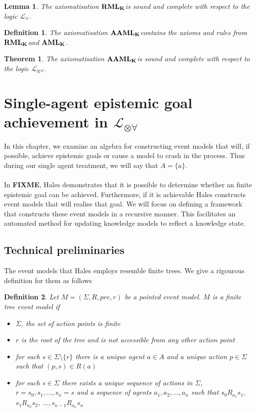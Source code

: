 \documentclass[12pt, a4paper, titlepage]{scrartcl}
\newtheorem{defn}{Definition}[subsection]
\newtheorem{thm}{Theorem}[subsection]
\newtheorem{lemma}{Lemma}[subsection]
\numberwithin{equation}{section}
\newcommand{\lang}{\mathcal{L}}
\newcommand{\langRefine}{\lang_{\forall}}
\newcommand{\langArbAct}{\lang_{\otimes\forall}}
\newcommand{\AXK}{{\bf K}}
\newcommand{\AXAML}{${\bf AML_{\AXK}}$}
\newcommand{\AXRML}{${\bf RML_{\AXK}}$}
\newcommand{\AXAAML}{${\bf AAML_{\AXK}}$}
\newcommand{\FIXME}{{\bf FIXME}}
\begin{document}
\begin{lemma} \label{axiomRMLSoundComplete}
The axiomatisation \AXRML is sound and complete with respect to the logic $\langRefine$.
\end{lemma}

\begin{defn} \label{axiomAAML}
The axiomatisation \AXAAML contains the axioms and rules from \AXRML and \AXAML.
\end{defn}

\begin{thm} \label{axiomAAMLSoundComplete}
The axiomatisation \AXAAML is sound and complete with respect to the logic $\langArbAct$.
\end{thm}

\section{Single-agent epistemic goal achievement in $\langArbAct$}

In this chapter, we examine an algebra for constructing event models that will, if possible, achieve
epistemic goals or cause a model to crash in the process.
Thus during our single agent treatment, we will say that $A = \{a\}$.\\
\\
In \FIXME, Hales demonstrates that it is possible to determine whether an
finite epistemic goal can be achieved.
Furthermore, if it is achievable Hales constructs event models that will realise
that goal.
We will focus on defining a framework that constructs these event models in a
recursive manner.
This facilitates an automated method for updating knowledge models to reflect a
knowledge state.

\subsection{Technical preliminaries}

The event models that Hales employs resemble finite trees.
We give a rigourous definition for them as follows

\begin{defn} \label{finTree}
Let $M = (\Sigma, R, pre, r)$ be a pointed event model.
$M$ is a finite tree event model if
\begin{itemize}
	\item $\Sigma$, the set of action points is finite
	\item $r$ is the root of the tree and is not accessible from any other action point
	\item for each $s \in \Sigma \setminus \{ r \}$ there is a unique agent $a \in A$ and a unique
	action $p \in \Sigma$ such that $(p,s) \in R(a)$
	\item for each $s \in \Sigma$ there exists a unique sequence of actions in $\Sigma$, $r = s_0,
	s_1, \ldots, s_n = s$ and a sequence of agents $a_1, a_2, \ldots, a_n$ such that $s_0 R_{a_1}
	s_1$, $s_1 R_{a_2} s_2$, $\ldots, s_{n-1} R_{a_n} s_n$
\end{itemize}
\end{defn}
\end{document}
